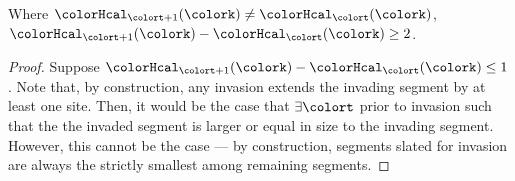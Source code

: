 \begin{lemma}
\label{thm:tilted-invader-minus-invaded}
Where $\colorHcal_{\colort + 1}(\colork) \neq \colorHcal_{\colort}(\colork)$, $\colorHcal_{\colort + 1}(\colork) - \colorHcal_{\colort}(\colork) \geq 2$.
\end{lemma}

\begin{proof}
Suppose $\colorHcal_{\colort + 1}(\colork) - \colorHcal_{\colort}(\colork) \leq 1$.
Note that, by construction, any invasion extends the invading segment by at least one site.
Then, it would be the case that $\exists \colort$ prior to invasion such that the the invaded segment is larger or equal in size to the invading segment.
However, this cannot be the case --- by construction, segments slated for invasion are always the strictly smallest among remaining segments.
\end{proof}
